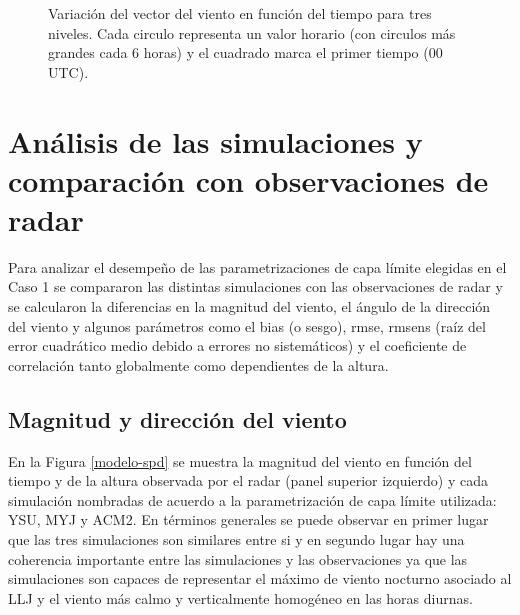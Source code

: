 \documentclass[12pt,spanish,oneside]{book}
\begin{document}
\begin{figure}

{\centering {}\newline{}

}

\caption{Variación del vector del viento en función del tiempo para tres niveles. Cada circulo representa un valor horario (con circulos más grandes cada 6 horas) y el cuadrado marca el primer tiempo (00 UTC). \label{hodografa-n}}\label{fig:hodografa-nivel}
\end{figure}

\section{Análisis de las simulaciones y comparación con observaciones de
radar}\label{analisis-de-las-simulaciones-y-comparacion-con-observaciones-de-radar}

Para analizar el desempeño de las parametrizaciones de capa límite
elegidas en el Caso 1 se compararon las distintas simulaciones con las
observaciones de radar y se calcularon la diferencias en la magnitud del
viento, el ángulo de la dirección del viento y algunos parámetros como
el bias (o sesgo), rmse, rmsens (raíz del error cuadrático medio debido
a errores no sistemáticos) y el coeficiente de correlación tanto
globalmente como dependientes de la altura.

\subsection{Magnitud y dirección del
viento}\label{magnitud-y-direccion-del-viento}

En la Figura \ref{modelo-spd} se muestra la magnitud del viento en
función del tiempo y de la altura observada por el radar (panel superior
izquierdo) y cada simulación nombradas de acuerdo a la parametrización
de capa límite utilizada: YSU, MYJ y ACM2. En términos generales se
puede observar en primer lugar que las tres simulaciones son similares
entre si y en segundo lugar hay una coherencia importante entre las
simulaciones y las observaciones ya que las simulaciones son capaces de
representar el máximo de viento nocturno asociado al LLJ y el viento más
calmo y verticalmente homogéneo en las horas diurnas.
\end{document}
